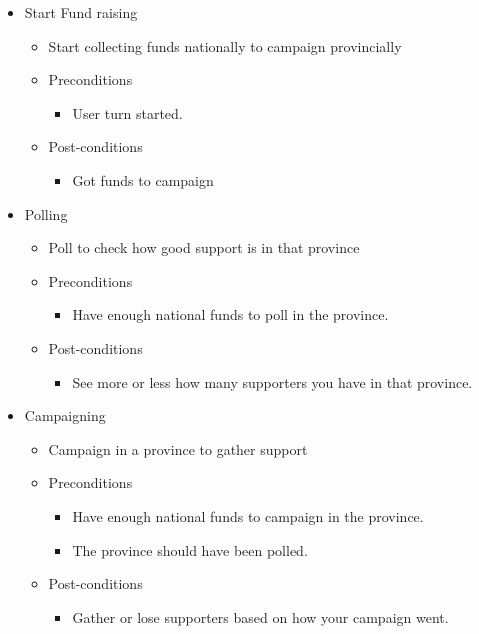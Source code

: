 \documentclass{article}
\begin{document}
	\begin{itemize}
   		\item  Start Fund raising
			\begin{itemize}
				\item Start collecting funds nationally to campaign provincially 
				\item Preconditions
				\begin{itemize}
					\item User turn started.
				\end{itemize}
				\item Post-conditions
				\begin{itemize}
					\item Got funds to campaign
				\end{itemize}
			\end{itemize}
	\end{itemize}
	
	\begin{itemize}
   		\item  Polling
			\begin{itemize}
				\item Poll to check how good support is in that province
				\item Preconditions
				\begin{itemize}
					\item Have enough national funds to poll in the province.
				\end{itemize}
				\item Post-conditions
				\begin{itemize}
					\item See more or less how many supporters you have in that province.
				\end{itemize}
			\end{itemize}
	\end{itemize}
	
	\begin{itemize}
   		\item  Campaigning
			\begin{itemize}
				\item Campaign in a province to gather support
				\item Preconditions
				\begin{itemize}
					\item Have enough national funds to campaign in the province.
					\item The province should have been polled.
				\end{itemize}
				\item Post-conditions
				\begin{itemize}
					\item Gather or lose supporters based on how your campaign went.
				\end{itemize}
			\end{itemize}
	\end{itemize}
	
\end{document}
